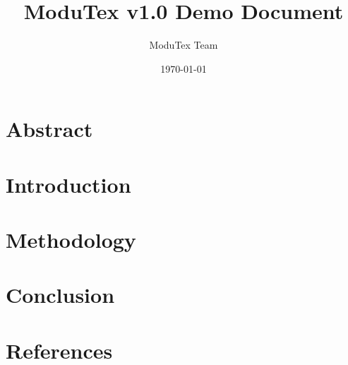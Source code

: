 \documentclass[11pt,a4paper]{article}
\title{ModuTex v1.0 Demo Document}
\author{ModuTex Team}
\date{\today}
\begin{document}
\maketitle

\tableofcontents
\newpage

\section{Abstract}


\section{Introduction}  


\section{Methodology}


\section{Conclusion}


\newpage
\section{References}


\end{document}
